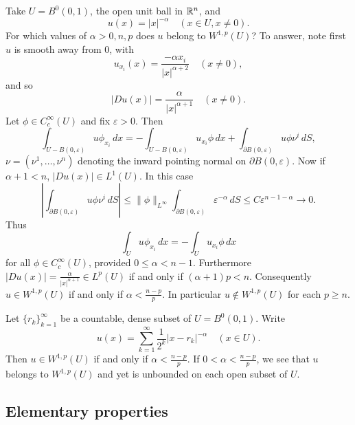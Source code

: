 \begin{example}
\label{ex:power-singularity-sobolev-membership}

Take $U = B^0(0,1)$, the open unit ball in $\mathbb{R}^n$, and
$$u(x) = |x|^{-\alpha} \quad (x \in U, x \ne 0).$$
For which values of $\alpha > 0, n, p$ does $u$ belong to $W^{1,p}(U)$? To answer, note first $u$ is smooth away from $0$, with
$$u_{x_i}(x) = \frac{-\alpha x_i}{|x|^{\alpha+2}} \quad (x \ne 0),$$
and so
$$|Du(x)| = \frac{\alpha}{|x|^{\alpha+1}} \quad (x \ne 0).$$
Let $\phi \in C_c^\infty(U)$ and fix $\varepsilon > 0$. Then
$$\int_{U - B(0,\varepsilon)} u\phi_{x_i}\,dx = -\int_{U - B(0,\varepsilon)} u_{x_i}\phi\,dx + \int_{\partial B(0,\varepsilon)} u\phi\nu^i\,dS,$$
$\nu = (\nu^1, \ldots, \nu^n)$ denoting the inward pointing normal on $\partial B(0,\varepsilon)$. Now if $\alpha + 1 < n$, $|Du(x)| \in L^1(U)$. In this case
$$\left|\int_{\partial B(0,\varepsilon)} u\phi\nu^i\,dS\right| \le \|\phi\|_{L^\infty} \int_{\partial B(0,\varepsilon)} \varepsilon^{-\alpha}\,dS \le C\varepsilon^{n-1-\alpha} \to 0.$$
Thus
$$\int_U u\phi_{x_i}\,dx = -\int_U u_{x_i}\phi\,dx$$
for all $\phi \in C_c^\infty(U)$, provided $0 \le \alpha < n - 1$. Furthermore $|Du(x)| = \frac{\alpha}{|x|^{\alpha+1}} \in L^p(U)$ if and only if $(\alpha+1)p < n$. Consequently $u \in W^{1,p}(U)$ if and only if $\alpha < \frac{n-p}{p}$. In particular $u \notin W^{1,p}(U)$ for each $p \ge n$.
\end{example}

\begin{example}
\label{ex:dense-singularities-unbounded-sobolev}

Let $\{r_k\}_{k=1}^{\infty}$ be a countable, dense subset of $U = B^0(0,1)$. Write
$$u(x) = \sum_{k=1}^{\infty} \frac{1}{2^k} |x - r_k|^{-\alpha} \quad (x \in U).$$
Then $u \in W^{1,p}(U)$ if and only if $\alpha < \frac{n-p}{p}$. If $0 < \alpha < \frac{n-p}{p}$, we see that $u$ belongs to $W^{1,p}(U)$ and yet is unbounded on each open subset of $U$.
\end{example}

\subsection{Elementary properties}

